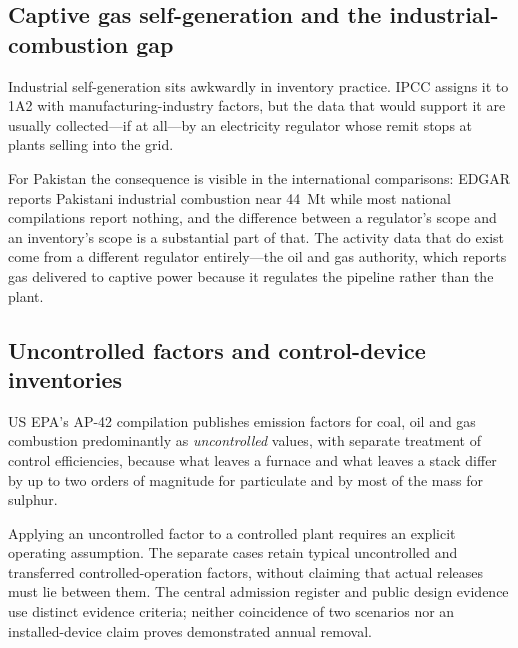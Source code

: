 \subsection{Captive gas self-generation and the industrial-combustion gap}

Industrial self-generation sits awkwardly in inventory practice. IPCC assigns it to 1A2 with
manufacturing-industry factors, but the data that would support it are usually collected---if
at all---by an electricity regulator whose remit stops at plants selling into the grid.

For Pakistan the consequence is visible in the international comparisons: EDGAR
\citep{edgar2025booklet} reports Pakistani industrial combustion near \SI{44}{\mega\tonne} while most
national compilations report nothing, and the difference between a regulator's scope and an
inventory's scope is a substantial part of that. The activity data that do exist come from a
different regulator entirely---the oil and gas authority, which reports gas delivered to
captive power because it regulates the pipeline rather than the plant.

\subsection{Uncontrolled factors and control-device inventories}

US EPA's AP-42 compilation \citep{epaap42} publishes emission factors for coal, oil and gas
combustion predominantly as \emph{uncontrolled} values, with separate treatment of control
efficiencies, because what leaves a furnace and what leaves a stack differ by up to two orders
of magnitude for particulate and by most of the mass for sulphur.

Applying an uncontrolled factor to a controlled plant requires an explicit operating assumption. The separate cases retain typical uncontrolled and transferred controlled-operation factors, without claiming that actual releases must lie between them. The central admission register and public design evidence use distinct evidence criteria; neither coincidence of two scenarios nor an installed-device claim proves demonstrated annual removal.
